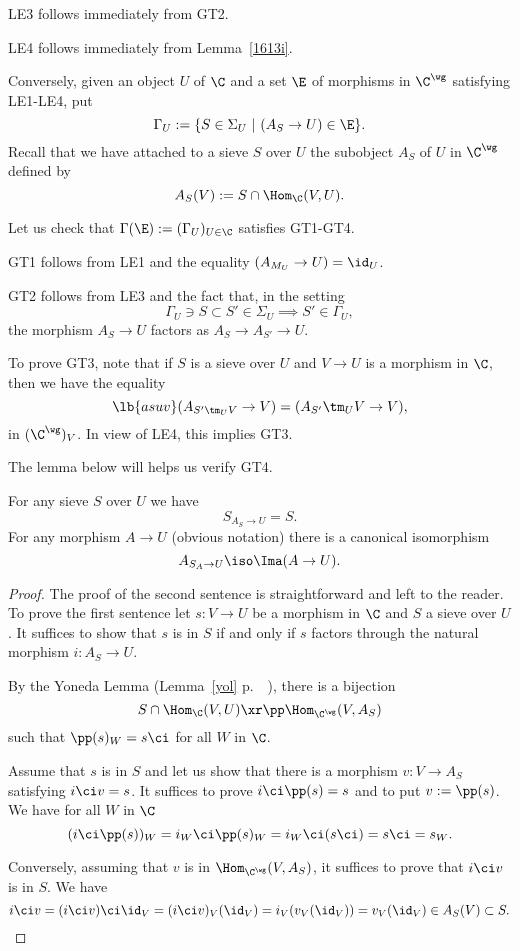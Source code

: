 \documentclass[12pt]{article}
\theoremstyle{remark}
\theoremstyle{definition}
\begin{document}
\nn LE3 follows immediately from GT2.

\nn LE4 follows immediately from Lemma~\ref{1613i}. 

Conversely, given an object $U$ of $\C$ and a set $\E$ of morphisms in $\C^\wg$ satisfying LE1-LE4, put
$$
\Gamma_U:=\{S\in\Sigma_U\ |\ (A_S\to U)\in\E\}.
$$ 
Recall that we have attached to a sieve $S$ over $U$ the subobject $A_S$ of $U$ in $\C^\wg$ defined by 
$$
A_S(V):=S\cap\Hom_\C(V,U).
$$ 

Let us check that $\Gamma(\E):=(\Gamma_U)_{U\in\C}$ satisfies GT1-GT4.

GT1 follows from LE1 and the equality $(A_{M_U}\to U)=\id_U$. 

GT2 follows from LE3 and the fact that, in the setting 
$$
\Gamma_U\ni S\subset S'\in\Sigma_U\implies S'\in\Gamma_U,
$$ 
the morphism $A_S\to U$ factors as $A_S\to A_{S'}\to U$. 

To prove GT3, note that if $S$ is a sieve over $U$ and $V\to U$ is a morphism in $\C$, then we have the equality
\begin{equation}\lb{asuv}
(A_{S'\tm_UV}\to V)=(A_{S'}\tm_UV\to V),%
\end{equation} 
in $(\C^\wg)_V$. In view of LE4, this implies GT3.

The lemma below will helps us verify GT4. 

\begin{lem}
For any sieve $S$ over $U$ we have
$$
S_{A_S\to U}=S.
$$%
For any morphism $A\to U$ (obvious notation) there is a canonical isomorphism 
$$
A_{S_A\to U}\iso\Ima(A\to U).
$$
\end{lem}

\begin{proof}
The proof of the second sentence is straightforward and left to the reader. To prove the first sentence let $s:V\to U$ be a morphism in $\C$ and $S$ a sieve over $U$. It suffices to show that $s$ is in $S$ if and only if $s$ factors through the natural morphism $i:A_S\to U$.

By the Yoneda Lemma (Lemma~\ref{yol} p.~~), there is a bijection 
$$
S\cap\Hom_\C(V,U)\xr\pp\Hom_{\C^\wg}(V,A_S)
$$
such that $\pp(s)_W=s\ci$ for all $W$ in $\C$. 

Assume that $s$ is in $S$ and let us show that there is a morphism $v:V\to A_S$ satisfying $i\ci v=s$. It suffices to prove $i\ci\pp(s)=s$ and to put $v:=\pp(s)$. We have for all $W$ in $\C$
$$
(i\ci\pp(s))_W=i_W\ci\pp(s)_W=i_W\ci(s\ci)=s\ci=s_W.
$$ 

Conversely, assuming that $v$ is in $\Hom_{\C^\wg}(V,A_S)$, it suffices to prove that $i\ci v$ is in $S$. We have 
$$
i\ci v=(i\ci v)\ci\id_V=(i\ci v)_V(\id_V)=i_V(v_V(\id_V))=v_V(\id_V)\in A_S(V)\subset S. 
$$ 
\end{proof} 
\end{document}

